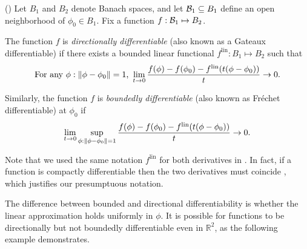 \begin{defn}
    (\citep[Definition 4.5]{zeidler:2013:functional})
%
Let $B_1$ and $B_2$ denote Banach spaces, and let $\mathcal{B}_1 \subseteq B_1$ define
an open neighborhood of $\phi_0 \in B_1$.  Fix a function $f: \mathcal{B}_1
\mapsto B_2$.

The function $f$ is {\em directionally differentiable} (also known as a Gateaux
differentiable) if there exists a bounded linear functional $f^{\mathrm{lin}}:
B_1 \mapsto B_2$ such that
%
\begin{align*}
%
\textrm{For any }\phi: \norm{\phi - \phi_0} = 1\textrm{, }
\lim_{t \rightarrow 0}
    \frac{f(\phi) - f(\phi_0) -
          f^{\mathrm{lin}}(t (\phi - \phi_0) )
         }{t} \rightarrow 0.
%
\end{align*}
%

Similarly, the function $f$ is {\em boundedly differentiable} (also known as
Fr{\'echet} differentiable) at $\phi_0$ if
%
\begin{align*}
%
\lim_{t \rightarrow 0}
    \sup_{\phi: \norm{\phi - \phi_0} = 1}
    \frac{f(\phi) - f(\phi_0) -
          f^{\mathrm{lin}}(t (\phi - \phi_0))
         }{t} \rightarrow 0.
%
\end{align*}
%
\end{defn}

Note that we used the same notation $f^{\mathrm{lin}}$ for both derivatives in
.  In fact, if a function is compactly differentiable
then the two derivatives must coincide \citep[Proposition
4.8]{zeidler:2013:functional}, which justifies our presumptuous notation.

The difference between bounded and directional differentiability is whether the
linear approximation holds uniformly in $\phi$.  It is possible for functions to
be directionally but not boundedly differentiable even in $\mathbb{R}^2$, as the
following example demonstrates.

